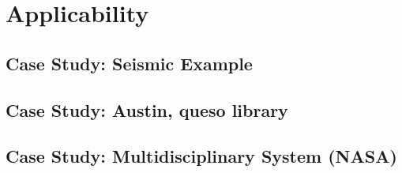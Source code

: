 \chapter[Applicability]{Applicability}\label{Applicability}

\section{Case Study: Seismic Example}

\section{Case Study: Austin, queso library}

\section{Case Study: Multidisciplinary System (NASA)}
